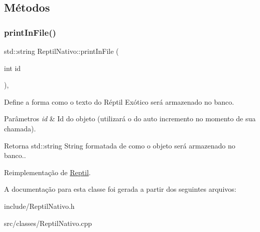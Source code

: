 \subsection{Métodos}
\mbox{\label{classReptilNativo_ac801a11c87a2847fb4b46488aa6bb789}} 
\subsubsection{\texorpdfstring{print\+In\+File()}{printInFile()}}
{\footnotesize\ttfamily std\+::string Reptil\+Nativo\+::print\+In\+File (\begin{DoxyParamCaption}\item[{int}]{id }\end{DoxyParamCaption})\hspace{0.3cm}{\ttfamily [protected]}, {\ttfamily [virtual]}}



Define a forma como o texto do Réptil Exótico será armazenado no banco. 


\begin{DoxyParams}{Parâmetros}
{\em id} & Id do objeto (utilizará o do auto incremento no momento de sua chamada). \\
\hline
\end{DoxyParams}
\begin{DoxyReturn}{Retorna}
std\+::string String formatada de como o objeto será armazenado no banco.. 
\end{DoxyReturn}


Reimplementação de \hyperlink{classReptil_af0fc1ff345f15480da9830e38111d181}{Reptil}.



A documentação para esta classe foi gerada a partir dos seguintes arquivos\+:\begin{DoxyCompactItemize}
\item 
include/Reptil\+Nativo.\+h\item 
src/classes/Reptil\+Nativo.\+cpp\end{DoxyCompactItemize}
